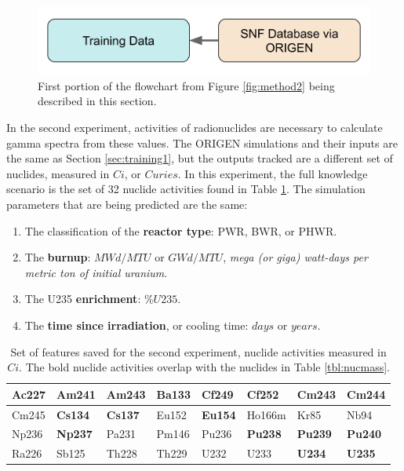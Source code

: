 \begin{figure}[H]
  \centering
  \includegraphics[width=0.7\linewidth]{./chapters/exp2/methodology2_1.png}
  \caption{First portion of the flowchart from Figure \ref{fig:method2} being 
           described in this section.}
\end{figure}

In the second experiment, activities of radionuclides are necessary to
calculate gamma spectra from these values. The \gls{ORIGEN} simulations and
their inputs are the same as Section \ref{sec:training1}, but the outputs
tracked are a different set of nuclides, measured in $Ci$, or $Curies$.  In
this experiment, the full knowledge scenario is the set of 32 nuclide
activities found in Table \ref{tbl:nucacts}.  The simulation parameters that
are being predicted are the same:
\begin{enumerate}
  \item The classification of the \textbf{reactor type}: \gls{PWR}, \gls{BWR}, 
        or \gls{PHWR}.
  \item The \textbf{burnup}: $MWd/MTU$ or $GWd/MTU$, \textit{mega (or giga) 
        watt-days per metric ton of initial uranium}.
  \item The \gls{U235} \textbf{enrichment}: $\%U235$. 
  \item The \textbf{time since irradiation}, or cooling time: $days$ or $years$.
\end{enumerate}

\begin{table}[!htb]
  \centering
  \begin{tabular}{@{}|l|l|l|l|l|l|l|l|@{}}
    \hline
    Ac227&\textbf{Am241}&\textbf{Am243}&Ba133&Cf249         &Cf252          &Cm243         &\textbf{Cm244} \\ \hline
    Cm245&\textbf{Cs134}&\textbf{Cs137}&Eu152&\textbf{Eu154}&Ho166m         &Kr85          &Nb94           \\ \hline
    Np236&\textbf{Np237}&Pa231         &Pm146&Pu236         &\textbf{Pu238} &\textbf{Pu239}&\textbf{Pu240} \\ \hline
    Ra226&Sb125         &Th228         &Th229&U232          & U233          &\textbf{U234} &\textbf{U235}  \\ \hline
  \end{tabular}
  \caption{Set of features saved for the second experiment, nuclide activities
           measured in $Ci$. The bold nuclide activities overlap with the 
           nuclides in Table \ref{tbl:nucmass}.}
  \label{tbl:nucacts}
\end{table}

